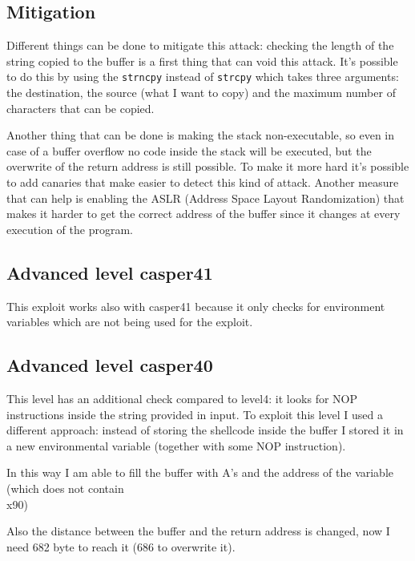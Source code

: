 \documentclass[a4paper,12pt]{article}
\begin{document}

\subsection{Mitigation}

Different things can be done to mitigate this attack: checking the length of the string copied to the buffer is a first thing that can void this attack. It's possible to do this by using the \texttt{strncpy} instead of \texttt{strcpy} which takes three arguments: the destination, the source (what I want to copy) and the maximum number of characters that can be copied.

Another thing that can be done is making the stack non-executable, so even in case of a buffer overflow no code inside the stack will be executed, but the overwrite of the return address is still possible. To make it more hard it's possible to add canaries that make easier to detect this kind of attack. Another measure that can help is enabling the ASLR (Address Space Layout Randomization) that makes it harder to get the correct address of the buffer since it changes at every execution of the program.

\subsection{Advanced level casper41}

This exploit works also with casper41 because it only checks for environment variables which are not being used for the exploit. 

\subsection{Advanced level casper40}

This level has an additional check compared to level4: it looks for NOP instructions inside the string provided in input. To exploit this level I used a different approach: instead of storing the shellcode inside the buffer I stored it in a new environmental variable (together with some NOP instruction).  

In this way I am able to fill the buffer with A's and the address of the variable (which does not contain \\x90)

Also the distance between the buffer and the return address is changed, now I need 682 byte to reach it (686 to overwrite it).
\end{document}
